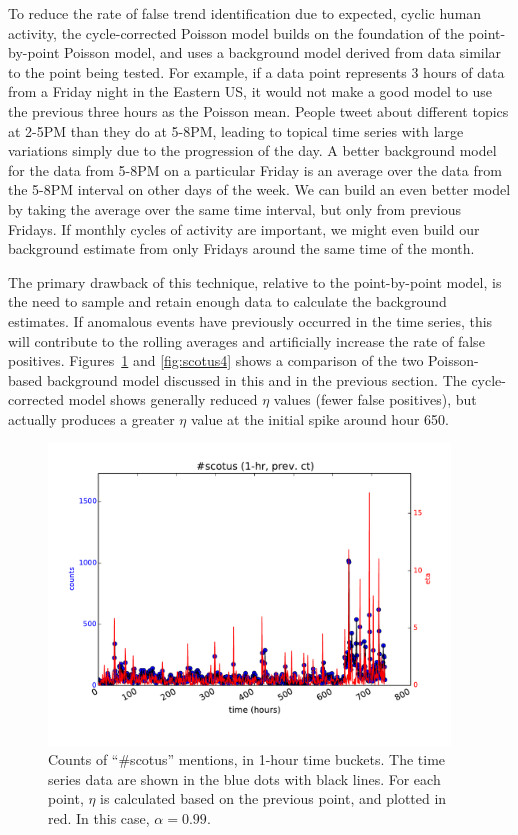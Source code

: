 \documentclass{article}
\begin{document}
To reduce the rate of false trend identification due to expected, cyclic human
activity, the cycle-corrected Poisson model builds on the foundation of the
point-by-point Poisson model, and uses a background model derived from data
similar to the point being tested. For example, if a data point represents 3
hours of data from a Friday night in the Eastern US, it would not make a good
model to use the previous three hours as the Poisson mean. People tweet about
different topics at 2-5PM than they do at 5-8PM, leading to topical time series
with large variations simply due to the progression of the day. A better
background model for the data from 5-8PM on a particular Friday is an average
over the data from the 5-8PM interval on other days of the week. We can build
an even better model by taking the average over the same time interval, but
only from previous Fridays. If monthly cycles of activity are important, we
might even build our background estimate from only Fridays around the same time
of the month. 

The primary drawback of this technique, relative to the point-by-point model,
is the need to sample and retain enough data to calculate the background
estimates. If anomalous events have previously occurred in the time series,
this will contribute to the rolling averages and artificially increase the rate
of false positives. Figures~\ref{fig:scotus3} and \ref{fig:scotus4} shows a comparison of the two Poisson-based
background model discussed in this and in the previous section. The
cycle-corrected model shows generally reduced $\eta$ values (fewer false
positives), but actually produces a greater $\eta$ value at the initial spike
around hour 650. 

\begin{figure}
\begin{center}
\includegraphics[width=0.95\textwidth]{fig/scotus_1month_pbppm.pdf}
\caption{Counts of ``\#scotus'' mentions, in 1-hour time buckets. The time series
data are shown in the blue dots with black lines. For each point, $\eta$ is
calculated based on the previous point, and plotted in red. In this case, 
$\alpha=0.99$.} \label{fig:scotus3}
\end{center}
\end{figure}
\end{document}
